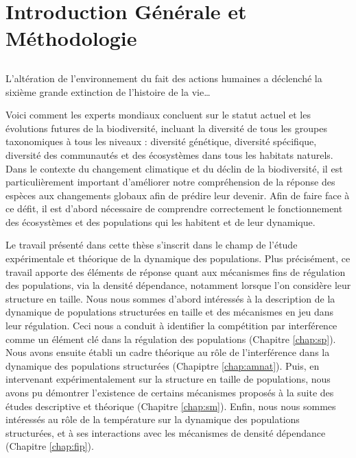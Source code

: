\part{Introduction Générale et Méthodologie}

\chapter*[Introduction]{}

\vspace{-5cm}

\og L'altération de l'environnement du fait des actions
humaines a déclenché la sixième grande extinction de l'histoire de la vie\ldots\fg
\autocites{stuart-chapin-iii2000a}

Voici comment les experts mondiaux concluent sur le statut actuel et les
évolutions futures de la biodiversité, incluant la diversité de tous les groupes
taxonomiques à tous les niveaux : diversité génétique, diversité spécifique,
diversité des communautés et des écosystèmes dans tous les habitats naturels.
Dans le contexte du changement climatique et du déclin de la biodiversité, il
est particulièrement important d'améliorer notre compréhension de la réponse
des espèces aux changements globaux afin de prédire leur devenir. Afin de faire
face à ce défit, il est d'abord nécessaire de comprendre correctement le
fonctionnement des écosystèmes et des populations qui les habitent et de leur
dynamique. 

Le travail présenté dans cette thèse s'inscrit dans le champ de l'étude
expérimentale et théorique de la dynamique des populations. Plus précisément, ce
travail apporte des éléments de réponse quant aux mécanismes fins de régulation
des populations, via la densité dépendance, notamment lorsque l'on considère
leur structure en taille.
Nous nous sommes d'abord intéressés à la description de la dynamique
de populations structurées en taille et des mécanismes en jeu dans leur
régulation. Ceci nous a conduit à identifier la compétition par interférence
comme un élément clé dans la régulation des populations (Chapitre
\ref{chap:sp}).
Nous avons ensuite établi un cadre théorique au rôle de l'interférence dans la
dynamique des populations structurées (Chapiptre \ref{chap:amnat}). Puis, en
intervenant expérimentalement sur la structure en taille de populations, nous avons pu démontrer 
l'existence de certains mécanismes proposés à la suite des études descriptive et
théorique (Chapitre \ref{chap:sm}).
Enfin, nous nous sommes intéressés au rôle de la température sur la dynamique
des populations structurées, et à ses interactions avec les mécanismes de densité
dépendance (Chapitre \ref{chap:fip}).





